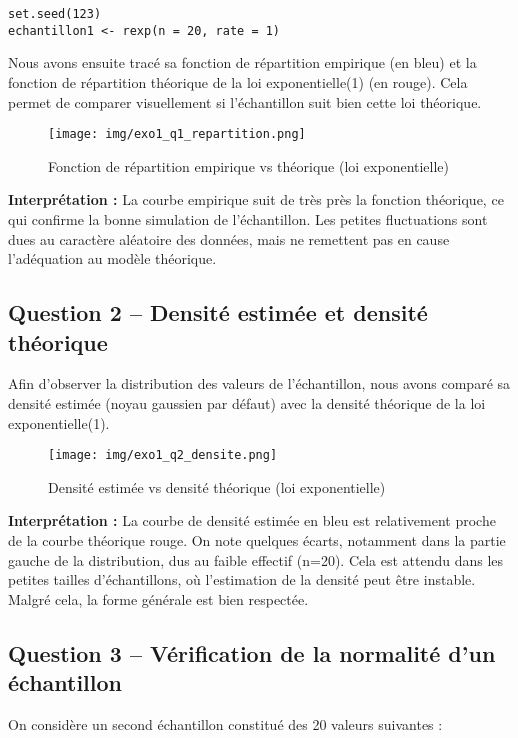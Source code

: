 \documentclass[a4paper,11pt]{article}
\begin{document}
\begin{verbatim}
set.seed(123)
echantillon1 <- rexp(n = 20, rate = 1)
\end{verbatim}

Nous avons ensuite tracé sa fonction de répartition empirique (en bleu) et la fonction de répartition théorique de la loi exponentielle(1) (en rouge). Cela permet de comparer visuellement si l’échantillon suit bien cette loi théorique.

\begin{figure}[H]
    \centering
    \texttt{[image: img/exo1\_q1\_repartition.png]}
    \caption{Fonction de répartition empirique vs théorique (loi exponentielle)}
\end{figure}

\textbf{Interprétation :} La courbe empirique suit de très près la fonction théorique, ce qui confirme la bonne simulation de l’échantillon. Les petites fluctuations sont dues au caractère aléatoire des données, mais ne remettent pas en cause l’adéquation au modèle théorique.

\subsection*{Question 2 – Densité estimée et densité théorique}
Afin d’observer la distribution des valeurs de l’échantillon, nous avons comparé sa densité estimée (noyau gaussien par défaut) avec la densité théorique de la loi exponentielle(1).

\begin{figure}[H]
    \centering
    \texttt{[image: img/exo1\_q2\_densite.png]}
    \caption{Densité estimée vs densité théorique (loi exponentielle)}
\end{figure}

\textbf{Interprétation :} La courbe de densité estimée en bleu est relativement proche de la courbe théorique rouge. On note quelques écarts, notamment dans la partie gauche de la distribution, dus au faible effectif (n=20). Cela est attendu dans les petites tailles d’échantillons, où l’estimation de la densité peut être instable. Malgré cela, la forme générale est bien respectée.

\vspace{1em}
\subsection*{Question 3 – Vérification de la normalité d’un échantillon}
On considère un second échantillon constitué des 20 valeurs suivantes :
\end{document}
